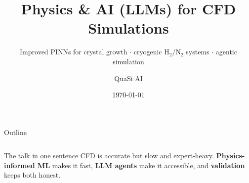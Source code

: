 \documentclass[aspectratio=169,10pt,t]{beamer}
\title[Physics \& AI for CFD]{Physics \& AI (LLMs) for CFD Simulations}
\subtitle{Improved PINNs for crystal growth $\cdot$ cryogenic H$_2$/N$_2$ systems $\cdot$ agentic simulation}
\author{QuaSi AI}
\date{\today}
\newcommand{\key}[1]{\textcolor{qblue}{\textbf{#1}}}
\begin{document}
\begin{frame}[c]
\titlepage
\end{frame}

\begin{frame}{Outline}
\begin{columns}[T,onlytextwidth]
\tableofcontents
{}
\begin{block}{The talk in one sentence}
\small CFD is accurate but slow and expert-heavy.
\key{Physics-informed ML} makes it fast,
\key{LLM agents} make it accessible,
and \key{validation} keeps both honest.
\end{block}
\end{columns}
\end{frame}

\end{document}
